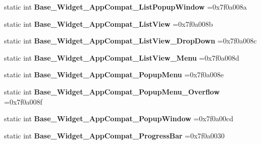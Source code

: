 \begin{DoxyCompactItemize}
static int {\bfseries Base\+\_\+\+Widget\+\_\+\+App\+Compat\+\_\+\+List\+Popup\+Window} =0x7f0a008a
\item 
\mbox{\label{classandroid_1_1support_1_1v7_1_1mediarouter_1_1R_1_1style_a304d80bb91a3edf453428605ddc5cb47}} 
static int {\bfseries Base\+\_\+\+Widget\+\_\+\+App\+Compat\+\_\+\+List\+View} =0x7f0a008b
\item 
\mbox{\label{classandroid_1_1support_1_1v7_1_1mediarouter_1_1R_1_1style_a44f80e480addd77e6bda73cf30f20fa9}} 
static int {\bfseries Base\+\_\+\+Widget\+\_\+\+App\+Compat\+\_\+\+List\+View\+\_\+\+Drop\+Down} =0x7f0a008c
\item 
\mbox{\label{classandroid_1_1support_1_1v7_1_1mediarouter_1_1R_1_1style_a34a5918b508dc3ab22e02bf271ca006e}} 
static int {\bfseries Base\+\_\+\+Widget\+\_\+\+App\+Compat\+\_\+\+List\+View\+\_\+\+Menu} =0x7f0a008d
\item 
\mbox{\label{classandroid_1_1support_1_1v7_1_1mediarouter_1_1R_1_1style_ac208872dc903d5e8f9eb0a72e6e9098f}} 
static int {\bfseries Base\+\_\+\+Widget\+\_\+\+App\+Compat\+\_\+\+Popup\+Menu} =0x7f0a008e
\item 
\mbox{\label{classandroid_1_1support_1_1v7_1_1mediarouter_1_1R_1_1style_acad881bb5a47c90a0fc3ff46998832f9}} 
static int {\bfseries Base\+\_\+\+Widget\+\_\+\+App\+Compat\+\_\+\+Popup\+Menu\+\_\+\+Overflow} =0x7f0a008f
\item 
\mbox{\label{classandroid_1_1support_1_1v7_1_1mediarouter_1_1R_1_1style_af88c902d09c675a1052d7ee75a2ebe4f}} 
static int {\bfseries Base\+\_\+\+Widget\+\_\+\+App\+Compat\+\_\+\+Popup\+Window} =0x7f0a00cd
\item 
\mbox{\label{classandroid_1_1support_1_1v7_1_1mediarouter_1_1R_1_1style_a3ba35164de88cbd52cb90583ac987601}} 
static int {\bfseries Base\+\_\+\+Widget\+\_\+\+App\+Compat\+\_\+\+Progress\+Bar} =0x7f0a0030

\end{DoxyCompactItemize}

